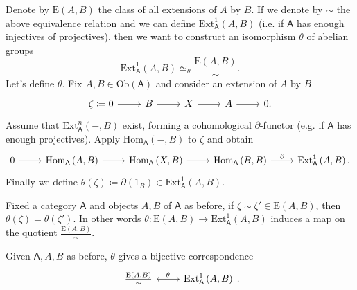 \begin{rem}
	Denote by $\mathrm{E}(A,B)$ the class of all extensions of $A$ by $B$.
	If we denote by $\sim$ the above equivalence relation and we can
	define $\mathrm{Ext}^{ 1}_{ \mathsf{A}} \left( A, B \right)$ (i.e. if $\mathsf{A}$
	has enough injectives of projectives), then we want to construct an isomorphism
	$\theta$ of abelian groups
	\begin{equation}
	\mathrm{Ext}^{ 1}_{ \mathsf{A}} \left( A, B \right) \simeq_{\theta}
	\frac{\mathrm{E}(A,B)}{\sim}
	.\end{equation} 
	Let's define $\theta$.
	Fix $A,B \in \mathrm{Ob} \left(\mathsf{A}\right)$ and consider an extension of $A$ by $B$
	\begin{equation*}
	\begin{tikzcd}
		\zeta \coloneqq 0 \arrow[r, "", rightarrow] &
		B \arrow[r, "", rightarrow] &
		X \arrow[r, "", rightarrow] &
		A \arrow[r, "", rightarrow] &
		0
	.\end{tikzcd}
	\end{equation*}
	Assume that $\mathrm{Ext}^{ n}_{ \mathsf{A}} \left( -, B \right)$ exist,
	forming a cohomological $\partial$-functor (e.g. if $\mathsf{A}$ has enough
	projectives).
	Apply $\mathrm{Hom}_{\mathsf{A}} \left( -, B \right)$ to $\zeta$ and obtain
	\begin{equation*}
	\begin{tikzcd}
		0 \arrow[r, "", rightarrow] &
		\mathrm{Hom}_{\mathsf{A}} \left( A, B \right) \arrow[r, "", rightarrow] &
		\mathrm{Hom}_{\mathsf{A}} \left( X, B \right) \arrow[r, "", rightarrow] &
		\mathrm{Hom}_{\mathsf{A}} \left( B, B \right) \arrow[r, "\partial", rightarrow] &
		\mathrm{Ext}^1_{\mathsf{A}} \left( A, B \right)
	.\end{tikzcd}
	\end{equation*}
	Finally we define $\theta(\zeta) \coloneqq \partial(1_B) \in \mathrm{Ext}^{ 1}_{ \mathsf{A}} \left( A, B \right)$.
\end{rem}

\begin{lem}
	Fixed a category $\mathsf{A}$ and objects $A,B$ of $\mathsf{A}$ as before, 
	if $\zeta \sim \zeta' \in \mathrm{E}(A,B)$, then $\theta(\zeta) = \theta(\zeta')$.
	In other words $\theta\colon \mathrm{E}(A,B) \to \mathrm{Ext}^{ 1}_{ \mathsf{A}} \left( A, B \right)$
	induces a map on the quotient $\frac{\mathrm{E}(A,B)}{\sim}$.
\end{lem} 

\begin{thm}[]
	Given $\mathsf{A},A,B$ as before,
	$\theta$ gives a bijective correspondence
	\begin{equation}
	\begin{tikzcd}
		\frac{\mathrm{E}(A,B)}{\sim} \arrow[r, "\theta", leftrightarrow] &
		\mathrm{Ext}^{ 1}_{ \mathsf{A}} \left( A, B \right)
	\end{tikzcd}
	.\end{equation} 
\end{thm}

